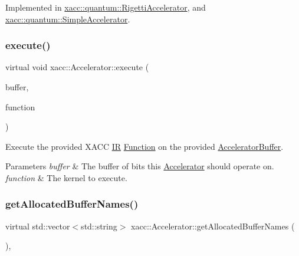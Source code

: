 Implemented in \hyperlink{a00939_a731551c94b1abef40d2cf032e8712df6}{xacc\+::quantum\+::\+Rigetti\+Accelerator}, and \hyperlink{a00959_adb9393692e9f484df241aa5d014030d1}{xacc\+::quantum\+::\+Simple\+Accelerator}.

\mbox{\label{a01111_a89b3f3e6294f228abf03a410b0fb1674}} 
\subsubsection{\texorpdfstring{execute()}{execute()}}
{\footnotesize\ttfamily virtual void xacc\+::\+Accelerator\+::execute (\begin{DoxyParamCaption}\item[{std\+::shared\+\_\+ptr$<$ \hyperlink{a01123}{Accelerator\+Buffer} $>$}]{buffer,  }\item[{const std\+::shared\+\_\+ptr$<$ \hyperlink{a01151}{Function} $>$}]{function }\end{DoxyParamCaption})\hspace{0.3cm}{\ttfamily [pure virtual]}}

Execute the provided X\+A\+CC \hyperlink{a01175}{IR} \hyperlink{a01151}{Function} on the provided \hyperlink{a01123}{Accelerator\+Buffer}.


\begin{DoxyParams}{Parameters}
{\em buffer} & The buffer of bits this \hyperlink{a01111}{Accelerator} should operate on. \\
\hline
{\em function} & The kernel to execute. \\
\hline
\end{DoxyParams}
\mbox{\label{a01111_ae1463d7e405df89fa4af47e8922f4b82}} 
\subsubsection{\texorpdfstring{get\+Allocated\+Buffer\+Names()}{getAllocatedBufferNames()}}
{\footnotesize\ttfamily virtual std\+::vector$<$std\+::string$>$ xacc\+::\+Accelerator\+::get\+Allocated\+Buffer\+Names (\begin{DoxyParamCaption}{ }\end{DoxyParamCaption})\hspace{0.3cm}{\ttfamily [inline]}, {\ttfamily [virtual]}}

